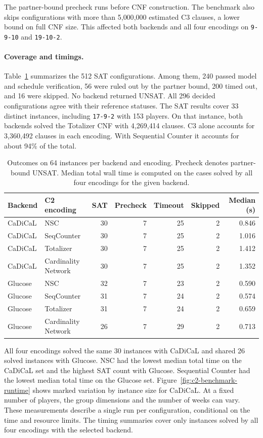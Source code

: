 \documentclass[a4paper,fleqn]{cas-sc}
\begin{document}
The partner-bound precheck runs before CNF construction. The benchmark
also skips configurations with more than 5{,}000{,}000 estimated C3
clauses, a lower bound on full CNF size. This affected both backends
and all four encodings on \texttt{9-9-10} and \texttt{19-10-2}.

\paragraph{Coverage and timings.}
Table~\ref{tab:c2-60s-outcomes} summarizes the 512 SAT configurations. Among
them, 240 passed model and schedule verification, 56 were ruled out
by the partner bound, 200 timed out, and 16 were skipped. No backend returned
UNSAT. All 296 decided configurations agree with their reference
statuses. The SAT results cover 33 distinct instances, including
\texttt{17-9-2} with 153 players. On that instance, both backends
solved the Totalizer CNF with 4{,}269{,}414 clauses. C3 alone accounts
for 3{,}360{,}492 clauses in each encoding. With Sequential Counter it
accounts for about 94\% of the total.

\begin{table}[pos=!htb]
\centering\small
\caption{Outcomes on 64 instances per backend and encoding. Precheck denotes partner-bound UNSAT. Median total wall time is computed on the cases solved by all four encodings for the given backend.}
\label{tab:c2-60s-outcomes}
\begin{tabular}{llrrrrr}
\toprule
Backend & C2 encoding & SAT & Precheck & Timeout & Skipped & Median (s) \\
\midrule
CaDiCaL & NSC & 30 & 7 & 25 & 2 & 0.846 \\
CaDiCaL & SeqCounter & 30 & 7 & 25 & 2 & 1.016 \\
CaDiCaL & Totalizer & 30 & 7 & 25 & 2 & 1.412 \\
CaDiCaL & Cardinality Network & 30 & 7 & 25 & 2 & 1.352 \\
\midrule
Glucose & NSC & 32 & 7 & 23 & 2 & 0.590 \\
Glucose & SeqCounter & 31 & 7 & 24 & 2 & 0.574 \\
Glucose & Totalizer & 31 & 7 & 24 & 2 & 0.659 \\
Glucose & Cardinality Network & 26 & 7 & 29 & 2 & 0.713 \\
\bottomrule
\end{tabular}
\end{table}

All four encodings solved the same 30 instances with CaDiCaL and
shared 26 solved instances with Glucose. NSC had the
lowest median total time on the CaDiCaL set and the highest SAT count
with Glucose. Sequential Counter had the lowest median total time on
the Glucose set. Figure~\ref{fig:c2-benchmark-runtime} shows marked
variation by instance size for CaDiCaL. At a fixed number of players,
the group dimensions and the number of weeks can vary. These
measurements describe a single run per configuration, conditional on the
time and resource limits. The timing summaries cover only instances
solved by all four encodings with the selected backend.
\end{document}
